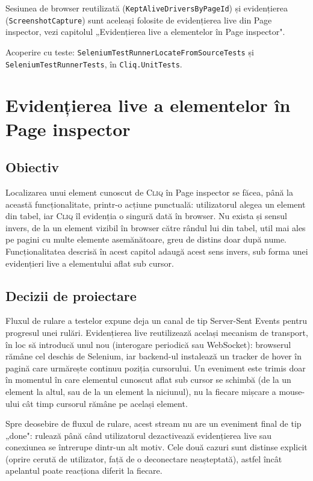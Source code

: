 \documentclass[12pt,a4paper]{report}
\newcommand{\File}[1]{\nolinkurl{#1}}
\newcommand{\Cliq}{\textsc{Cliq}}
\begin{document}
Sesiunea de browser reutilizată (\File{KeptAliveDriversByPageId}) și evidențierea (\File{ScreenshotCapture}) sunt aceleași folosite de evidențierea live din Page inspector, vezi capitolul „Evidențierea live a elementelor în Page inspector".

Acoperire cu teste: \File{SeleniumTestRunnerLocateFromSourceTests} și \File{SeleniumTestRunnerTests}, în \File{Cliq.UnitTests}.

\chapter[Evidențierea live a elementelor]{Evidențierea live a elementelor în Page inspector}

\section{Obiectiv}

Localizarea unui element cunoscut de \Cliq{} în Page inspector se făcea, până la această funcționalitate, printr-o acțiune punctuală: utilizatorul alegea un element din tabel, iar \Cliq{} îl evidenția o singură dată în browser. Nu exista și sensul invers, de la un element vizibil în browser către rândul lui din tabel, util mai ales pe pagini cu multe elemente asemănătoare, greu de distins doar după nume. Funcționalitatea descrisă în acest capitol adaugă acest sens invers, sub forma unei evidențieri live a elementului aflat sub cursor.

\section{Decizii de proiectare}

Fluxul de rulare a testelor expune deja un canal de tip Server-Sent Events pentru progresul unei rulări. Evidențierea live reutilizează același mecanism de transport, în loc să introducă unul nou (interogare periodică sau WebSocket): browserul rămâne cel deschis de Selenium, iar backend-ul instalează un tracker de hover în pagină care urmărește continuu poziția cursorului. Un eveniment este trimis doar în momentul în care elementul cunoscut aflat sub cursor se schimbă (de la un element la altul, sau de la un element la niciunul), nu la fiecare mișcare a mouse-ului cât timp cursorul rămâne pe același element.

Spre deosebire de fluxul de rulare, acest stream nu are un eveniment final de tip „done": rulează până când utilizatorul dezactivează evidențierea live sau conexiunea se întrerupe dintr-un alt motiv. Cele două cazuri sunt distinse explicit (oprire cerută de utilizator, față de o deconectare neașteptată), astfel încât apelantul poate reacționa diferit la fiecare.
\end{document}
